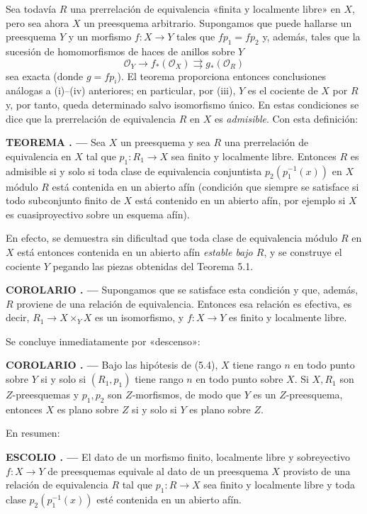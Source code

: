 \documentclass[11pt,twoside,openany]{book}
\numberwithin{equation}{section}
\newcommand{\src}[1]{%
  \phantomsection\hypertarget{src:#1}{}%
  \marginpar{\raggedleft\footnotesize\sffamily #1}%
}
\theoremstyle{plain}
\theoremstyle{definition}
\theoremstyle{remark}
\newcommand{\result}[2]{%
  \par\medskip\noindent\textbf{#1%
  \if\relax\detokenize{#2}\relax\else\space#2\fi. ---}\enspace
}
\newcommand{\FgaUnitKey}{frontmatter}
\renewcommand{\src}[1]{%
  \phantomsection\hypertarget{src:\FgaUnitKey:#1}{}%
  \marginpar{\raggedleft\footnotesize\sffamily #1}%
}
\theoremstyle{plain}
\theoremstyle{definition}
\theoremstyle{remark}
\begin{document}
Sea todavía $R$ una prerrelación de equivalencia «finita y localmente libre»
en $X$, pero sea ahora $X$ un preesquema arbitrario. Supongamos que puede
hallarse un preesquema $Y$ y un morfismo $f:X\to Y$ tales que $fp_1=fp_2$ y,
además, tales que la sucesión de homomorfismos de haces de anillos sobre $Y$
\[
  \mathcal O_Y\longrightarrow f_*(\mathcal O_X)
  \rightrightarrows g_*(\mathcal O_R)
\]
sea exacta (donde $g=fp_i$). El teorema proporciona entonces conclusiones
análogas a (i)--(iv) anteriores; en particular, por (iii), $Y$ es el cociente
de $X$ por $R$ y, por tanto, queda determinado salvo isomorfismo único. En
estas condiciones se dice que la prerrelación de equivalencia $R$ en $X$ es
\emph{admisible}. Con esta definición:

\result{TEOREMA}{5.3} Sea $X$ un preesquema y sea $R$ una prerrelación de
equivalencia en $X$ tal que $p_1:R_1\to X$ sea finito y localmente libre.
Entonces $R$ es admisible si y solo si toda clase de equivalencia conjuntista
$p_2(p_1^{-1}(x))$ en $X$ módulo $R$ está contenida en un abierto afín
(condición que siempre se satisface si todo subconjunto finito de $X$ está
contenido en un abierto afín, por ejemplo si $X$ es cuasiproyectivo sobre un
esquema afín).

En efecto, se demuestra sin dificultad que toda clase de equivalencia módulo
$R$ en $X$ está entonces contenida en un abierto afín \emph{estable bajo
$R$}, y se construye el cociente $Y$ pegando las piezas obtenidas del Teorema
5.1.
\src{112}

\result{COROLARIO}{5.4} Supongamos que se satisface esta condición y que,
además, $R$ proviene de una relación de equivalencia. Entonces esa relación es
efectiva, es decir, $R_1\to X\times_Y X$ es un isomorfismo, y $f:X\to Y$ es
finito y localmente libre.

Se concluye inmediatamente por «descenso»:

\result{COROLARIO}{5.5} Bajo las hipótesis de (5.4), $X$ tiene rango $n$ en
todo punto sobre $Y$ si y solo si $(R_1,p_1)$ tiene rango $n$ en todo punto
sobre $X$. Si $X,R_1$ son $Z$-preesquemas y $p_1,p_2$ son $Z$-morfismos, de
modo que $Y$ es un $Z$-preesquema, entonces $X$ es plano sobre $Z$ si y solo
si $Y$ es plano sobre $Z$.

En resumen:

\result{ESCOLIO}{} El dato de un morfismo finito, localmente libre y
sobreyectivo $f:X\to Y$ de preesquemas equivale al dato de un preesquema $X$
provisto de una relación de equivalencia $R$ tal que $p_1:R\to X$ sea finito
y localmente libre y toda clase $p_2(p_1^{-1}(x))$ esté contenida en un
abierto afín.
\end{document}
